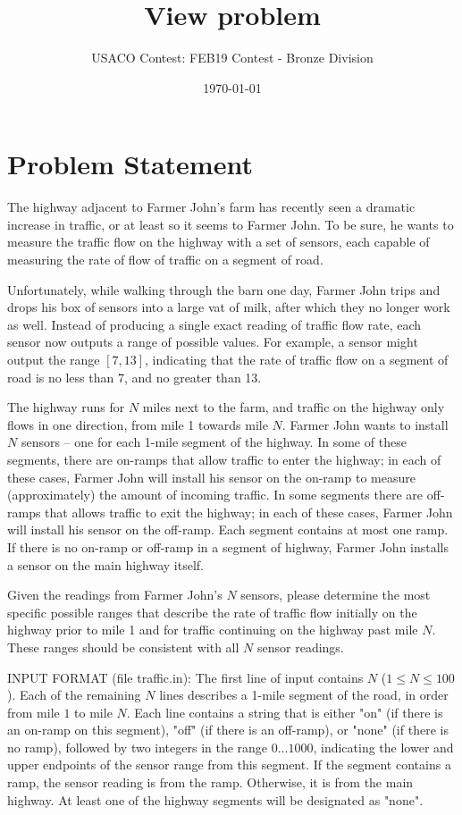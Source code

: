 \documentclass[12pt]{article}
\title{View problem}
\author{USACO Contest: FEB19 Contest - Bronze Division}
\date{\today}
\begin{document}
\maketitle

\section*{Problem Statement}

The highway adjacent to Farmer John's farm has recently seen a dramatic increase
in traffic, or at least so it seems to Farmer John.  To be sure, he wants to
measure the traffic flow on the highway with a set of  sensors, each capable of
measuring the rate of flow of traffic on a  segment of road.  

Unfortunately, while walking through the barn one day, Farmer John trips and
drops his box of sensors into a large vat of milk, after which they no longer
work as well.  Instead of producing a single exact reading of traffic flow rate,
each sensor now outputs a range of possible values. For example, a sensor might
output the range $[7, 13]$, indicating that the rate of traffic flow on a
segment of road is no less than 7, and no greater than 13.

The highway runs for $N$ miles next to the farm, and traffic on the highway only
flows in one direction, from mile 1 towards mile $N$.  Farmer John wants to
install $N$ sensors -- one for each 1-mile segment of the highway. In some of
these segments, there are on-ramps that allow traffic to enter the highway; in each of
these cases, Farmer John will install his sensor on the on-ramp to measure
(approximately) the amount of incoming traffic.  In some segments there are 
off-ramps that allows traffic to exit the highway; in each of these cases, Farmer John will
install his sensor on the off-ramp.  Each segment contains at most one ramp.  
If there is no on-ramp or off-ramp in a segment of highway, Farmer John installs
a sensor on the main highway itself.  

Given the readings from Farmer John's $N$ sensors, please determine the most
specific possible ranges that describe the rate of traffic flow initially on
the highway prior to mile 1 and for traffic continuing on the highway past mile
$N$.  These ranges should be consistent with all $N$ sensor readings.

INPUT FORMAT (file traffic.in):
The first line of input contains $N$ ($1 \leq N \leq 100$).  Each of the
remaining $N$ lines describes a 1-mile segment of the road, in order from mile
$1$ to mile $N$.  Each line contains a string that is either "on" (if there is
an on-ramp on this segment), "off" (if there is an off-ramp), or "none" (if
there is no ramp), followed by two integers  in the range $0 \ldots 1000$,
indicating the lower and upper endpoints of the sensor range from this segment.
If the segment contains a ramp, the sensor reading is from the ramp.  Otherwise,
it is from the main highway.  At least one of the highway segments will be
designated as "none".
\end{document}

